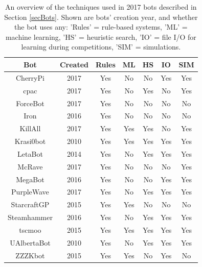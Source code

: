 
\begin{table}[t] 
 
 \begin{center}
 \begin{tabular} {| c | c | c | c | c | c | c |}
 \hline
 \textbf{Bot} & \textbf{Created} & \textbf{Rules} & \textbf{ML} & \textbf{HS} & \textbf{IO} & \textbf{SIM}\\
 \hline
 CherryPi & 2017 & Yes & No & No & Yes & Yes\\
 \hline
 cpac & 2017 & Yes & No & Yes & No & Yes\\
 \hline
	ForceBot & 2017 & Yes & No & No & No & No\\
 \hline
Iron & 2016 & Yes & No & No & No & No\\
 \hline
KillAll & 2017 & Yes & Yes & Yes & No & Yes\\
 \hline
Krasi0bot & 2010 & Yes & Yes & Yes & Yes & Yes\\
 \hline
LetaBot & 2014 & Yes & No & Yes & Yes & Yes\\
 \hline
McRave & 2017 & Yes & No & No & No & Yes\\
 \hline
MegaBot & 2016 & Yes & No & No & Yes & Yes\\
 \hline
PurpleWave & 2017 & Yes & No & Yes & Yes & Yes\\
 \hline
StarcraftGP & 2015 & Yes & Yes & No & No & No\\
 \hline
Steamhammer & 2016 & Yes & No & Yes & Yes & Yes\\
 \hline
tscmoo & 2015 & Yes & Yes & Yes & Yes & Yes\\
 \hline
 UAlbertaBot & 2010 & Yes & No & Yes & Yes & Yes\\
 \hline
 ZZZKbot & 2015 & Yes & Yes & No & Yes & No\\
 \hline
 \end{tabular}
 \end{center}  
 \caption{An overview of the techniques used in 2017 bots described in Section \ref{secBots}. Shown are bots' creation year, and whether the bot uses any: 'Rules' = rule-based systems, 'ML' = machine learning, 'HS' = heuristic search, 'IO' = file I/O for learning during competitions, 'SIM' = simulations. }
 \label{tableBots}
\end{table} 

